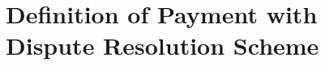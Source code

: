 





\section{ Definition of Payment with Dispute Resolution Scheme}\label{sec::def}





%
%
%
%
%
